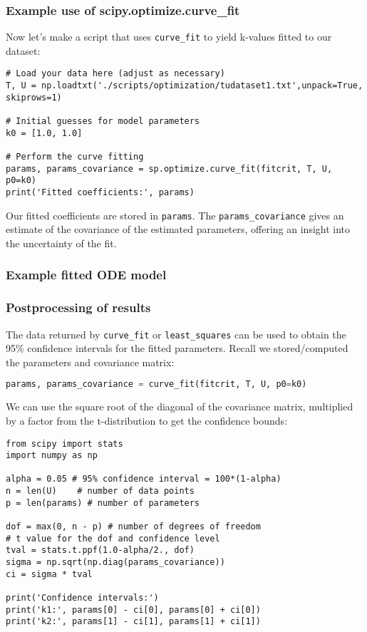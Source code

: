     \begin{frame}[fragile] 
    \frametitle{Example use of scipy.optimize.curve\_fit}
    Now let's make a script that uses \lstinline$curve_fit$ to yield k-values fitted to our dataset:
    \pause
    \begin{lstlisting}
# Load your data here (adjust as necessary)
T, U = np.loadtxt('./scripts/optimization/tudataset1.txt',unpack=True, skiprows=1)

# Initial guesses for model parameters
k0 = [1.0, 1.0]

# Perform the curve fitting
params, params_covariance = sp.optimize.curve_fit(fitcrit, T, U, p0=k0)
print('Fitted coefficients:', params)
    \end{lstlisting}
    Our fitted coefficients are stored in \lstinline|params|. The \lstinline|params_covariance| gives an estimate of the covariance of the estimated parameters, offering an insight into the uncertainty of the fit.
    \end{frame}      

\begin{frame}[fragile] 
  \frametitle{Example fitted ODE model}
  \centering
\end{frame}


\begin{frame}[fragile,label={postprocess_fit}] 
  \frametitle{Postprocessing of results}
  The data returned by \lstinline|curve_fit| or \lstinline|least_squares| can be used to obtain the 95\% confidence intervals for the fitted parameters. Recall we stored/computed the parameters and covariance matrix:
  \begin{lstlisting}[language=Python]
params, params_covariance = curve_fit(fitcrit, T, U, p0=k0)
  \end{lstlisting}
  We can use the square root of the diagonal of the covariance matrix, multiplied by a factor from the t-distribution to get the confidence bounds:
  \begin{lstlisting}
from scipy import stats
import numpy as np

alpha = 0.05 # 95% confidence interval = 100*(1-alpha)
n = len(U)    # number of data points
p = len(params) # number of parameters

dof = max(0, n - p) # number of degrees of freedom
# t value for the dof and confidence level
tval = stats.t.ppf(1.0-alpha/2., dof) 
sigma = np.sqrt(np.diag(params_covariance))
ci = sigma * tval

print('Confidence intervals:')
print('k1:', params[0] - ci[0], params[0] + ci[0])
print('k2:', params[1] - ci[1], params[1] + ci[1])
  \end{lstlisting}
  \end{frame}

